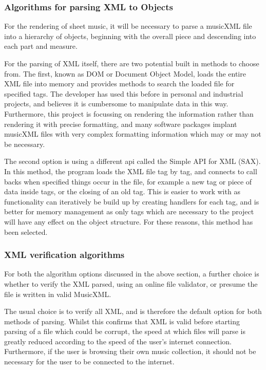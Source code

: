 \subsubsection{Algorithms for parsing XML to Objects}
For the rendering of sheet music, it will be necessary to parse a musicXML file into a hierarchy of objects, beginning with the overall piece and descending into each part and measure. 

For the parsing of XML itself, there are two potential built in methods to choose from. The first, known as DOM or Document Object Model, loads the entire XML file into memory and provides methods to search the loaded file for specified tags. The developer has used this before in personal and industrial projects, and believes it is cumbersome to manipulate data in this way. Furthermore, this project is focussing on rendering the information rather than rendering it with precise formatting, and many software packages implant musicXML files with very complex formatting information which may or may not be necessary.

The second option is using a different api called the Simple API for XML (SAX). In this method, the program loads the XML file tag by tag, and connects to call backs when specified things occur in the file, for example a new tag or piece of data inside tags, or the closing of an old tag. This is easier to work with as functionality can iteratively be build up by creating handlers for each tag, and is better for memory management as only tags which are necessary to the project will have any effect on the object structure. For these reasons, this method has been selected.

\subsubsection{XML verification algorithms}
For both the algorithm options discussed in the above section, a further choice is whether to verify the XML parsed, using an online file validator, or presume the file is written in valid MusicXML. 

The usual choice is to verify all XML, and is therefore the default option for both methods of parsing. Whilst this confirms that XML is valid before starting parsing of a file which could be corrupt, the speed at which files will parse is greatly reduced according to the speed of the user's internet connection.
Furthermore, if the user is browsing their own music collection, it should not be necessary for the user to be connected to the internet.

